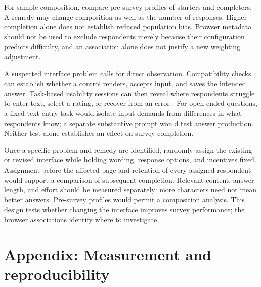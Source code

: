 \documentclass[11pt]{article}
\begin{document}
For sample composition, compare pre-survey profiles of starters and completers. A remedy may change composition as well as the number of responses. Higher completion alone does not establish reduced population bias. Browser metadata should not be used to exclude respondents merely because their configuration predicts difficulty, and an association alone does not justify a new weighting adjustment.


A suspected interface problem calls for direct observation. Compatibility checks can establish whether a control renders, accepts input, and saves the intended answer. Task-based usability sessions can then reveal where respondents struggle to enter text, select a rating, or recover from an error \citep{moran2019}. For open-ended questions, a fixed-text entry task would isolate input demands from differences in what respondents know; a separate substantive prompt would test answer production. Neither test alone establishes an effect on survey completion.

Once a specific problem and remedy are identified, randomly assign the existing or revised interface while holding wording, response options, and incentives fixed. Assignment before the affected page and retention of every assigned respondent would support a comparison of subsequent completion. Relevant content, answer length, and effort should be measured separately: more characters need not mean better answers. Pre-survey profiles would permit a composition analysis. This design tests whether changing the interface improves survey performance; the browser associations identify where to investigate.

\begingroup
\small
{}


\endgroup
\clearpage
\appendix
\section*{Appendix: Measurement and reproducibility}

\end{document}
